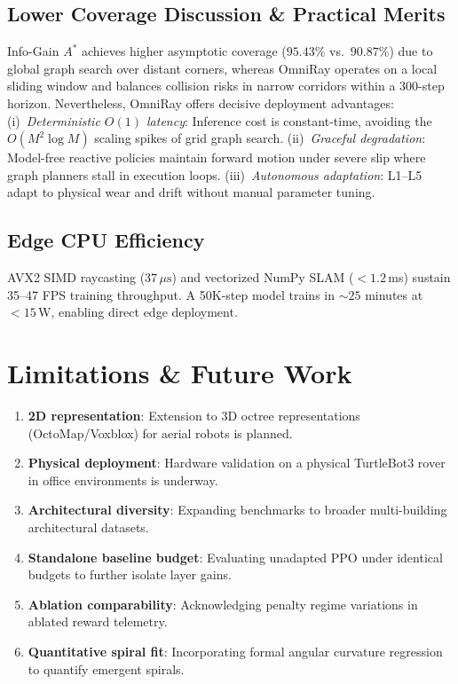 \documentclass[conference]{IEEEtran}
\begin{document}
\subsection{Lower Coverage Discussion \& Practical Merits}
Info-Gain $A^*$ achieves higher asymptotic coverage ($95.43\%$ vs.\ $90.87\%$) due to global graph search over distant corners, whereas OmniRay operates on a local sliding window and balances collision risks in narrow corridors within a 300-step horizon. Nevertheless, OmniRay offers decisive deployment advantages:
(i)~\textit{Deterministic $O(1)$ latency}: Inference cost is constant-time, avoiding the $O(M^2 \log M)$ scaling spikes of grid graph search.
(ii)~\textit{Graceful degradation}: Model-free reactive policies maintain forward motion under severe slip where graph planners stall in execution loops.
(iii)~\textit{Autonomous adaptation}: L1--L5 adapt to physical wear and drift without manual parameter tuning.

\subsection{Edge CPU Efficiency}
AVX2 SIMD raycasting ($37\,\mu\text{s}$) and vectorized NumPy SLAM ($<1.2$\,ms) sustain 35--47 FPS training throughput. A 50K-step model trains in ${\sim}25$ minutes at $<15$\,W, enabling direct edge deployment.

\section{Limitations \& Future Work}
\begin{enumerate}
    \item \textbf{2D representation}: Extension to 3D octree representations (OctoMap/Voxblox) for aerial robots is planned.
    \item \textbf{Physical deployment}: Hardware validation on a physical TurtleBot3 rover in office environments is underway.
    \item \textbf{Architectural diversity}: Expanding benchmarks to broader multi-building architectural datasets.
    \item \textbf{Standalone baseline budget}: Evaluating unadapted PPO under identical budgets to further isolate layer gains.
    \item \textbf{Ablation comparability}: Acknowledging penalty regime variations in ablated reward telemetry.
    \item \textbf{Quantitative spiral fit}: Incorporating formal angular curvature regression to quantify emergent spirals.
\end{enumerate}
\end{document}
